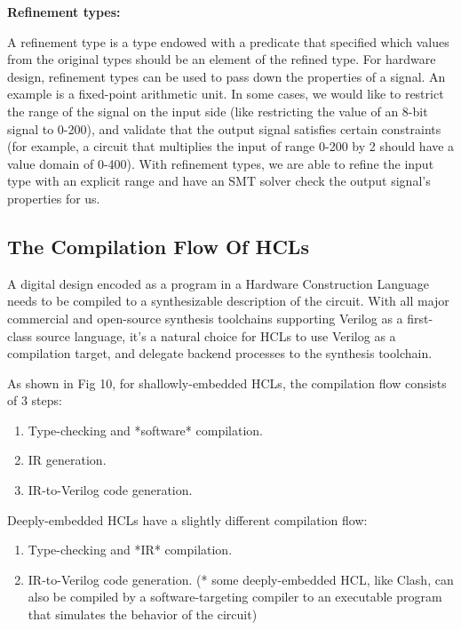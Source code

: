 \documentclass{article}
\begin{document}
\textbf{Refinement types:}

A refinement type is a type endowed with a predicate that specified which values from the original types should be an element of the refined type. For hardware design, refinement types can be used to pass down the properties of a signal. An example is a fixed-point arithmetic unit. In some cases, we would like to restrict the range of the signal on the input side (like restricting the value of an 8-bit signal to 0-200), and validate that the output signal satisfies certain constraints (for example, a circuit that multiplies the input of range 0-200 by 2 should have a value domain of 0-400). With refinement types, we are able to refine the input type with an explicit range and have an SMT solver check the output signal’s properties for us.

\subsection{The Compilation Flow Of HCLs}
A digital design encoded as a program in a Hardware Construction Language needs to be compiled to a synthesizable description of the circuit. With all major commercial and open-source synthesis toolchains supporting Verilog as a first-class source language, it’s a natural choice for HCLs to use Verilog as a compilation target, and delegate backend processes to the synthesis toolchain.

As shown in Fig 10, for shallowly-embedded HCLs, the compilation flow consists of 3 steps:
\begin{enumerate}
    \item Type-checking and *software* compilation.
    \item IR generation.
    \item IR-to-Verilog code generation.
\end{enumerate}

Deeply-embedded HCLs have a slightly different compilation flow:
\begin{enumerate}
    \item Type-checking and *IR* compilation.
    \item IR-to-Verilog code generation. (* some deeply-embedded HCL, like Clash, can also be compiled by a software-targeting compiler to an executable program that simulates the behavior of the circuit)
\end{enumerate}
\end{document}
